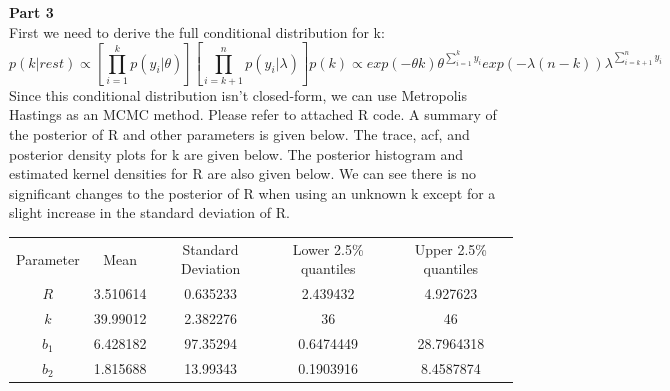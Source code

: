 \documentclass[10pt,a4paper]{article}
\begin{document}
\textbf{Part 3}\\
First we need to derive the full conditional distribution for k:\\
$$p(k|rest)\propto [\prod_{i=1}^{k}p(y_i|\theta)][\prod_{i=k+1}^{n}p(y_i|\lambda)]p(k)\propto exp(-\theta k)\theta^{\sum_{i=1}^{k}y_i}exp(-\lambda(n-k))\lambda^{\sum_{i=k+1}^{n}y_i} $$
Since this conditional distribution isn't closed-form, we can use Metropolis Hastings as an MCMC method. Please refer to attached R code. A summary of the posterior of R and other parameters is given below. The trace, acf, and posterior density plots for k are given below. The posterior histogram and estimated kernel densities for R are also given below. We can see there is no significant changes to the posterior of R when using an unknown k except for a slight increase in the standard deviation of R.

\begin{center}
  \begin{tabular}{ |c|c|c|c|c| }
  \hline
  Parameter & Mean & Standard Deviation & Lower 2.5\% quantiles & Upper 2.5\% quantiles  \\ 
  $R$ & 3.510614 & 0.635233 & 2.439432 & 4.927623 \\
  $k$ & 39.99012 & 2.382276 & 36 & 46 \\
  $b_1$ & 6.428182 &  97.35294 &  0.6474449 & 28.7964318  \\
  $b_2$ &  1.815688 & 13.99343 & 0.1903916 & 8.4587874 \\
  \hline
  \end{tabular}
  \end{center}
  
\end{document}
